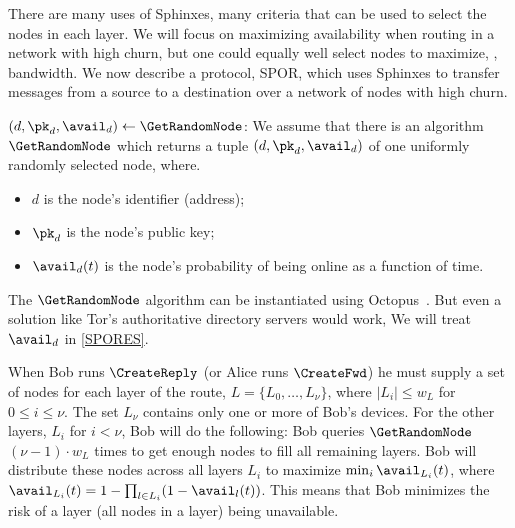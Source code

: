 There are many uses of Sphinxes, many criteria that can be used to select the 
nodes in each layer.
We will focus on maximizing availability when routing in a network with high 
churn, but one could equally well select nodes to maximize, \eg, bandwidth.
We now describe a protocol, \ac{SPOR}, which uses Sphinxes to transfer messages 
from a source to a destination over a network of nodes with high churn.

\((d, \pk_d, \avail_d)\gets \GetRandomNode\): We assume that there is an 
algorithm \(\GetRandomNode\) which returns a tuple \((d, \pk_d, \avail_d)\) of 
one uniformly randomly selected node, where.
\begin{itemize}
  \item \(d\) is the node's identifier (address);
  \item \(\pk_d\) is the node's public key;
  \item \(\avail_d(t)\) is the node's probability of being online as a function 
    of time.
\end{itemize}
The \(\GetRandomNode\) algorithm can be instantiated using \eg
Octopus~\cite{Octopus}.
But even a solution like Tor's authoritative directory servers would work,
We will treat \(\avail_d\) in \cref{SPORES}.

When Bob runs \(\CreateReply\) (or Alice runs \(\CreateFwd\)) he must supply a 
set of nodes for each layer of the route, \(L = \{L_0, \dotsc, L_\nu\}\), where 
\(|L_i| \leq w_L\) for \(0\leq i\leq \nu\).
The set \(L_\nu\) contains only one or more of Bob's devices.
For the other layers, \(L_i\) for \(i < \nu\), Bob will do the following:
Bob queries \(\GetRandomNode\) \((\nu-1)\cdot w_L\) times to get enough nodes 
to fill all remaining layers.
Bob will distribute these nodes across all layers \(L_i\) to maximize \(\min_i 
  \avail_{L_i}(t)\), where \(\avail_{L_i}(t) = 1-\prod_{l\in L_i} 
  (1-\avail_l(t))\).
This means that Bob minimizes the risk of a layer (\ie all nodes in a layer) 
being unavailable.

